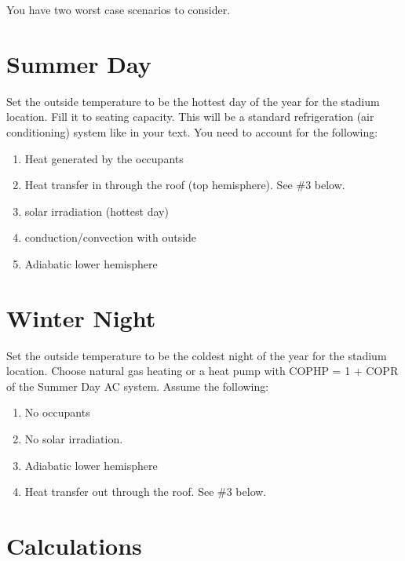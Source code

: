 \documentclass[
]{book}
\providecommand{\tightlist}{%
  \setlength{\itemsep}{0pt}\setlength{\parskip}{0pt}}
\begin{document}
You have two worst case scenarios to consider.

\hypertarget{summer-day}{%
\section{Summer Day}\label{summer-day}}

Set the outside temperature to be the hottest day of the year for the stadium location. Fill it to seating capacity. This will be a standard refrigeration (air conditioning) system like in your text. You need to account for the following:

\begin{enumerate}
\def\labelenumi{\arabic{enumi}.}
\tightlist
\item
  Heat generated by the occupants\\
\item
  Heat transfer in through the roof (top hemisphere). See \#3 below.\\
\item
  solar irradiation (hottest day)\\
\item
  conduction/convection with outside\\
\item
  Adiabatic lower hemisphere
\end{enumerate}

\hypertarget{winter-night}{%
\section{Winter Night}\label{winter-night}}

Set the outside temperature to be the coldest night of the year for the stadium location. Choose natural gas heating or a heat pump with COPHP = 1 + COPR of the Summer Day AC system. Assume the following:

\begin{enumerate}
\def\labelenumi{\arabic{enumi}.}
\tightlist
\item
  No occupants\\
\item
  No solar irradiation.\\
\item
  Adiabatic lower hemisphere\\
\item
  Heat transfer out through the roof. See \#3 below.
\end{enumerate}

\hypertarget{calculations}{%
\section{Calculations}\label{calculations}}
\end{document}
